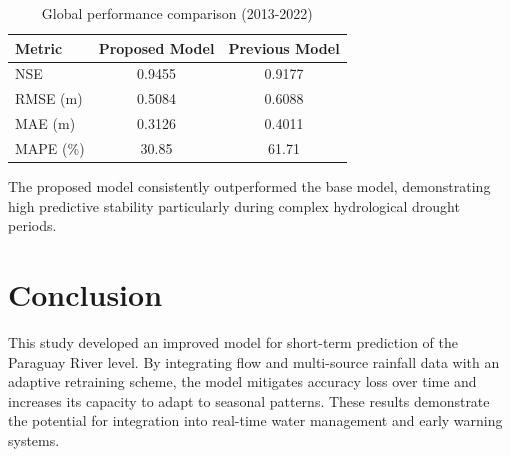 \documentclass[11pt, a4paper, oneside]{Thesis} %
\begin{document}
    \begin{table}[H]
    \centering
    \caption{Global performance comparison (2013-2022)}
    \label{tab:results}
    \begin{tabular}{lcc}
    \toprule
    \textbf{Metric} & \textbf{Proposed Model} & \textbf{Previous Model} \\
    \midrule
    NSE & 0.9455 & 0.9177 \\
    RMSE (m) & 0.5084 & 0.6088 \\
    MAE (m) & 0.3126 & 0.4011 \\
    MAPE (\%) & 30.85 & 61.71 \\
    \bottomrule
    \end{tabular}
    \end{table}

    The proposed model consistently outperformed the base model, demonstrating high predictive stability particularly during complex hydrological drought periods.

    \section{Conclusion}
    This study developed an improved model for short-term prediction of the Paraguay River level. By integrating flow and multi-source rainfall data with an adaptive retraining scheme, the model mitigates accuracy loss over time and increases its capacity to adapt to seasonal patterns. These results demonstrate the potential for integration into real-time water management and early warning systems.

    \clearpage
    \printbibliography
\end{document}
